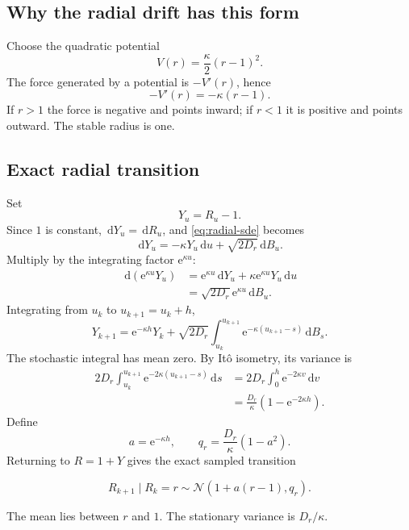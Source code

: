 \documentclass[11pt,a4paper]{article}
\newcommand{\N}{\mathcal{N}}
\newcommand{\dd}{\,\mathrm d}
\newcommand{\e}{\mathrm e}
\begin{document}
\subsection{Why the radial drift has this form}

Choose the quadratic potential
\begin{equation}
 V(r)=\frac{\kappa}{2}(r-1)^2.
\end{equation}
The force generated by a potential is $-V'(r)$, hence
\[
 -V'(r)=-\kappa(r-1).
\]
If $r>1$ the force is negative and points inward; if $r<1$ it is positive and points outward. The stable radius is one.

\subsection{Exact radial transition}

Set
\[
 Y_u=R_u-1.
\]
Since $1$ is constant, $\dd Y_u=\dd R_u$, and \cref{eq:radial-sde} becomes
\begin{equation}
 \dd Y_u=-\kappa Y_u\dd u+\sqrt{2D_r}\dd B_u.
 \label{eq:shifted-radial}
\end{equation}
Multiply by the integrating factor $\e^{\kappa u}$:
\begin{align}
 \dd(\e^{\kappa u}Y_u)
 &=\e^{\kappa u}\dd Y_u+\kappa\e^{\kappa u}Y_u\dd u\\
 &=\sqrt{2D_r}\e^{\kappa u}\dd B_u.
\end{align}
Integrating from $u_k$ to $u_{k+1}=u_k+h$,
\begin{equation}
 Y_{k+1}=\e^{-\kappa h}Y_k
 +\sqrt{2D_r}\int_{u_k}^{u_{k+1}}
 \e^{-\kappa(u_{k+1}-s)}\dd B_s.
 \label{eq:radial-solution}
\end{equation}
The stochastic integral has mean zero. By It\^o isometry, its variance is
\begin{align}
 2D_r\int_{u_k}^{u_{k+1}}
 \e^{-2\kappa(u_{k+1}-s)}\dd s
 &=2D_r\int_0^h\e^{-2\kappa v}\dd v\\
 &=\frac{D_r}{\kappa}(1-\e^{-2\kappa h}).
\end{align}
Define
\begin{equation}
 a=\e^{-\kappa h},
 \qquad
 q_r=\frac{D_r}{\kappa}(1-a^2).
 \label{eq:a-qr}
\end{equation}
Returning to $R=1+Y$ gives the exact sampled transition
\begin{keyresult}
\begin{equation}
 \boxed{
 R_{k+1}\mid R_k=r
 \sim\N\left(1+a(r-1),q_r\right).}
 \label{eq:radial-transition}
\end{equation}
\end{keyresult}
The mean lies between $r$ and $1$. The stationary variance is $D_r/\kappa$.
\end{document}
